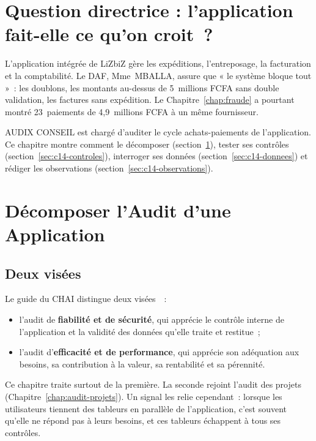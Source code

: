 \bigskip

\section*{Question directrice : l'application fait-elle ce qu'on croit~?}

L'application intégrée de LiZbiZ gère les expéditions, l'entreposage, la
facturation et la comptabilité. Le DAF, Mme~MBALLA, assure que « le
système bloque tout »~: les doublons, les montants au-dessus de
5~millions FCFA sans double validation, les factures sans expédition. Le
Chapitre~\ref{chap:fraude} a pourtant montré 23~paiements de
4,9~millions FCFA à un même fournisseur.

AUDIX CONSEIL est chargé d'auditer le cycle achats-paiements de
l'application. Ce chapitre montre comment le décomposer
(section~\ref{sec:c14-decomposer}), tester ses contrôles
(section~\ref{sec:c14-controles}), interroger ses données
(section~\ref{sec:c14-donnees}) et rédiger les observations
(section~\ref{sec:c14-observations}).

\separateur

\section{Décomposer l'Audit d'une Application}
\label{sec:c14-decomposer}

\subsection{Deux visées}

Le guide du CHAI distingue deux visées~\cite{chai2014guide}~:
\begin{itemize}
    \item l'audit de \textbf{fiabilité et de sécurité}, qui apprécie le
          contrôle interne de l'application et la validité des données
          qu'elle traite et restitue~;
    \item l'audit d'\textbf{efficacité et de performance}, qui apprécie son
          adéquation aux besoins, sa contribution à la valeur, sa
          rentabilité et sa pérennité.
\end{itemize}
Ce chapitre traite surtout de la première. La seconde rejoint l'audit des
projets (Chapitre~\ref{chap:audit-projets}). Un signal les relie
cependant~: lorsque les utilisateurs tiennent des tableurs en parallèle de
l'application, c'est souvent qu'elle ne répond pas à leurs besoins, et ces
tableurs échappent à tous ses contrôles.

